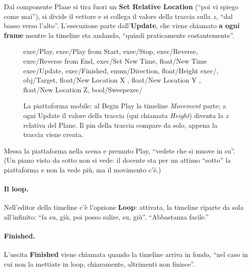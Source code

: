 Dal componente Plane si tira fuori un \textbf{Set Relative Location}
(``poi vi spiego come mai''), si divide il vettore e si collega il valore della
traccia sulla $z$, ``dal basso verso l'alto''. L'esecuzione parte
dall'\textbf{Update}, che viene chiamato \textbf{a ogni frame} mentre la
timeline sta andando, ``quindi praticamente costantemente''.

\begin{figure}[htbp]
\centering
\begin{bpgraph}
    {exec/Play, exec/Play from Start, exec/Stop, exec/Reverse, exec/Reverse from End, exec/Set New Time, float/New Time}%
    {exec/Update, exec/Finished, enum/Direction, float/Height}
    {exec/, obj/Target, float/New Location X , float/New Location Y , float/New Location Z, bool/Sweep}{exec/}
\end{bpgraph}
\caption{La piattaforma mobile: al Begin Play la timeline \emph{Movement}
parte; a ogni Update il valore della traccia (qui chiamata \emph{Height})
diventa la $z$ relativa del Plane. Il pin della traccia compare da solo,
appena la traccia viene creata.}
\label{gd12:fig:piattaforma}
\end{figure}

Messa la piattaforma nella scena e premuto Play, ``vedete che si muove in su''.
(Un piano visto da sotto non si vede: il docente sta per un attimo ``sotto'' la
piattaforma e non la vede più, ma il movimento c'è.)

\paragraph{Il loop.} Nell'editor della timeline c'è l'opzione \textbf{Loop}:
attivata, la timeline riparte da sola all'infinito: ``fa su, giù, poi posso
salire, su, giù''. ``Abbastanza facile.''

\paragraph{Finished.} L'uscita \textbf{Finished} viene chiamata quando la
timeline arriva in fondo, ``nel caso in cui non la mettiate in loop,
chiaramente, altrimenti non finisce''.


